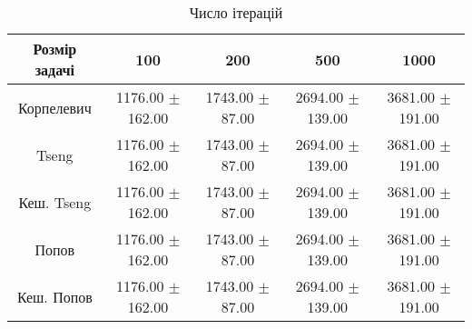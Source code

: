 \begin{table}[H]
	\centering
	\begin{tabular}{|c||c|c|c|c|}\hline
		Розмір задачі & 100 & 200 & 500 & 1000 \\ \hline \hline
		Корпелевич & 1176.00 $\pm$ 162.00 & 1743.00 $\pm$ 87.00 & 2694.00 $\pm$ 139.00 & 3681.00 $\pm$ 191.00 \\ \hline
		Tseng & 1176.00 $\pm$ 162.00 & 1743.00 $\pm$ 87.00 & 2694.00 $\pm$ 139.00 & 3681.00 $\pm$ 191.00 \\ \hline
		Кеш. Tseng & 1176.00 $\pm$ 162.00 & 1743.00 $\pm$ 87.00 & 2694.00 $\pm$ 139.00 & 3681.00 $\pm$ 191.00 \\ \hline
		Попов & 1176.00 $\pm$ 162.00 & 1743.00 $\pm$ 87.00 & 2694.00 $\pm$ 139.00 & 3681.00 $\pm$ 191.00 \\ \hline
		Кеш. Попов & 1176.00 $\pm$ 162.00 & 1743.00 $\pm$ 87.00 & 2694.00 $\pm$ 139.00 & 3681.00 $\pm$ 191.00 \\ \hline
	\end{tabular}
	\caption{Число ітерацій}
\end{table}

